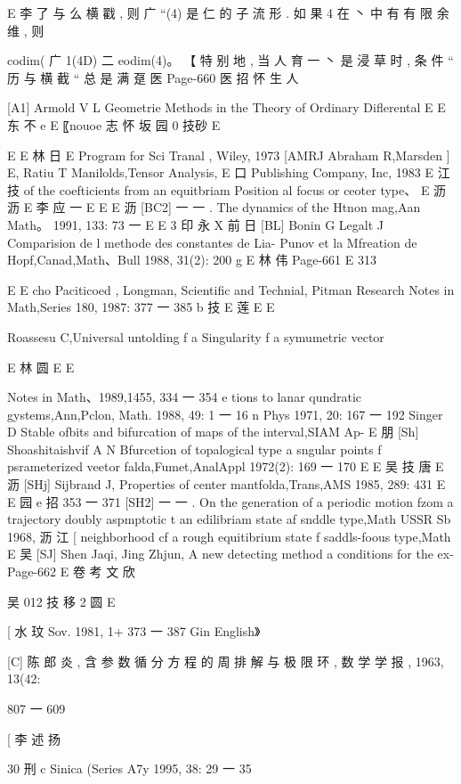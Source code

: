 E 李
了 与 么 横 戳 , 则 广 “(4) 是 仁 的 子 流 形 . 如 果 4 在 丶 中 有 有 限 余
维 , 则

codim( 广 1(4D) 二 eodim(4)。 【
特 别 地 , 当 人 育 一 丶 是 浸 草 时 , 条 件 “ 历 与 横 截 “ 总 是 满 趸
医
Page-660
医 招 怀 生 人

[A1] Armold V L Geometrie Methods in the Theory of Ordinary Diflerental
E
E 东 不 e
E
〖nouoe 志 怀 坂 园 0 技砂
E

E
E 林 日
E
Program for Sci Tranal , Wiley, 1973
[AMRJ Abraham R,Marsden ] E, Ratiu T Manilolds,Tensor Analysis,
E 口
Publishing Company, Inc, 1983
E 江 技
of the coefticients from an equitbriam Position al focus or ceoter type、
E 沥 沥 E 李 应 一
E
E
E 沥
[BC2] 一 一 . The dynamics of the Htnon mag,Aan Math。 1991, 133: 73 一
E
E
3 印 永 X 前 日
[BL] Bonin G Legalt J Comparision de l methode des constantes de Lia-
Punov et la Mfreation de Hopf,Canad,Math、Bull 1988, 31(2): 200
g
E 林 伟
Page-661
E 313

E
E
cho Paciticoed , Longman, Scientific and Technial, Pitman Research
Notes in Math,Series 180, 1987: 377 一 385
b 技
E 莲 E
E

Roassesu C,Universal untolding f a Singularity f a symumetric vector

E 林 圆
E E

Notes in Math、1989,1455, 334 一 354
e
tions to lanar qundratic gystems,Ann,Pclon, Math. 1988, 49: 1 一 16
n
Phys 1971, 20: 167 一 192
Singer D Stable ofbits and bifurcation of maps of the interval,SIAM Ap-
E 朋
[Sh] Shoashitaishvif A N Bfurcetion of topalogical type a sngular points f
psrameterized veetor falda,Fumet,AnalAppl 1972(2): 169 一 170
E
E 吴 技 唐 E 沥
[SHj] Sijbrand J, Properties of center mantfolda,Trans,AMS 1985, 289: 431
E
E 园 e 招
353 一 371
[SH2] 一 一 . On the generation of a periodic motion fzom a trajectory doubly
aspmptotic t an edilibriam state af snddle type,Math USSR Sb 1968,
沥 江
[
neighborhood cf a rough equitibrium state f saddls-foous type,Math
E 吴
[SJ] Shen Jaqi, Jing Zhjun, A new detecting method a conditions for the ex-
Page-662
E 卷 考 文 欣

吴
012 技 移 2 圆
E

[ 水
玟
Sov. 1981, 1+ 373 一 387 Gin English》

[C] 陈 郎 炎 , 含 参 数 循 分 方 程 的 周 排 解 与 极 限 环 , 数 学 学 报 , 1963, 13(42:

807 一 609

[ 李 述 扬

30 刑 c
Sinica (Series A7y 1995, 38: 29 一 35

